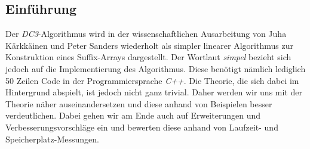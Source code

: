 \subsection{Einführung}
\label{dc3:einfuehrung}

Der \emph{DC3}-Algorithmus wird in der wissenschaftlichen Ausarbeitung von Juha Kärkkäinen und Peter Sanders wiederholt als simpler linearer Algorithmus zur Konstruktion eines Suffix-Arrays dargestellt. Der Wortlaut \emph{simpel} bezieht sich jedoch auf die Implementierung des Algorithmus. Diese benötigt nämlich le\-dig\-lich 50 Zeilen Code in der Programmiersprache \emph{C++}. Die Theorie, die sich dabei im Hintergrund abspielt, ist jedoch nicht ganz trivial. Daher werden wir uns mit der Theorie näher auseinandersetzen und diese anhand von Beispielen besser verdeutlichen. Dabei gehen wir am Ende auch auf Erweiterungen und Ver\-bes\-se\-rungs\-vor\-schlä\-ge ein und bewerten diese anhand von Laufzeit- und Speicherplatz-Messungen.
